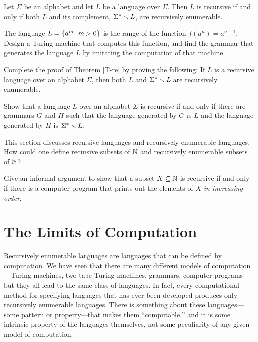 \begin{theorem}\label{T-re}
Let $\Sigma$ be an alphabet and let $L$ be a language over $\Sigma$.
Then $L$ is recursive if and only if both $L$ and its
complement, $\Sigma^*\smallsetminus L$, are recursively enumerable.
\end{theorem}

\begin{exercises}

\problem The language $L=\{a^m\,|\, m>0\}$ is the range of the function
$f(a^n)=a^{n+1}$.  Design a Turing machine that computes this function,
and find the grammar that generates the language $L$ by
imitating the computation of that machine.

\problem Complete the proof of Theorem \ref{T-re} by proving
the following:  If $L$ is a recursive language over an
alphabet $\Sigma$, then both
$L$ and $\Sigma^*\smallsetminus L$ are recursively enumerable.

\problem Show that a language $L$ over an alphabet $\Sigma$
is recursive if and only if there are grammars $G$
and $H$ such that the language generated by $G$ is $L$ and the
language generated by $H$ is $\Sigma^*\smallsetminus L$.

\problem This section discusses recursive languages and recursively
enumerable languages.  How could one define recursive subsets of
${\mathbb N}$ and recursively enumerable subsets of ${\mathbb N}$?

\problem Give an informal argument to show that a subset $X\subseteq{\mathbb N}$ is
recursive if and only if there is a computer program
that prints out the elements of $X$ {\it in increasing order}.

\end{exercises}



\section{The Limits of Computation}\label{S-turing-3}

Recursively enumerable languages are languages that can be defined by computation.
We have seen that there are many different models of compu\-tation---Turing machines,
two-tape Turing machines, grammars, computer programs---but they all lead
to the same class of languages.  In fact, every computational method for
specifying languages that has ever been developed produces only recursively
enumerable languages.  There is something about these languages---some pattern
or property---that makes them ``computable,''  and it is some intrinsic
property of the languages themselves, not some peculiarity of any given
model of computation.

